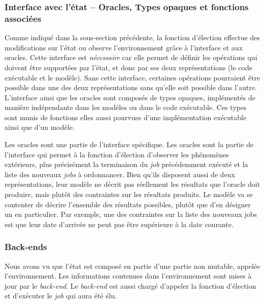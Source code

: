 		\subsubsection{Interface avec l'état -- Oracles, Types opaques et fonctions associées}
			
			Comme indiqué dans la sous-section précédente, la fonction d'élection effectue des modifications sur l'état ou observe l'environnement grâce à l'interface et aux oracles. Cette interface est \emph{nécessaire} car elle permet de définir les opérations qui doivent être supportées par l'état, et donc par ses deux représentations (le code exécutable et le modèle). Sans cette interface, certaines opérations pourraient être possible dans une des deux représentations sans qu'elle soit possible dans l'autre.
			L'interface ainsi que les oracles sont composés de types opaques, implémentés de manière indépendante dans les modèles ou dans le code exécutable. Ces types sont munis de fonctions elles aussi pourvues d'une implémentation exécutable ainsi que d'un modèle.

			Les oracles sont une partie de l'interface spécifique. Les oracles sont la partie de l'interface qui permet à la fonction d'élection d'observer les phénomènes extérieurs, plus précisément la terminaison du \emph{job} précédemment exécuté et la liste des nouveaux \emph{jobs} à ordonnancer. Bien qu'ils disposent aussi de deux représentations, leur modèle ne décrit pas réellement les résultats que l'oracle doit produire, mais plutôt des contraintes sur les résultats produits. Le modèle va se contenter de décrire l'ensemble des résultats possibles, plutôt que d'en désigner un en particulier. Par exemple, une des contraintes sur la liste des nouveaux jobs est que leur date d'arrivée ne peut pas être supérieure à la date courante. 

		\subsubsection{Back-ends}
		\label{sec:back-ends}

		Nous avons vu que l'état est composé en partie d'une partie non mutable, appelée l'environnement. Les informations contenues dans l'environnement sont mises à jour par le \emph{back-end}. Le \emph{back-end} est aussi chargé d'appeler la fonction d'élection et d'exécuter le \emph{job} qui aura été élu.

